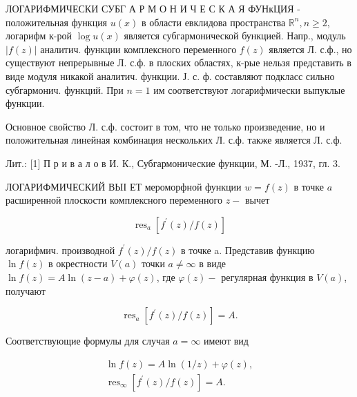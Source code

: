 \documentclass[10pt]{article}
\begin{document}
ЛОГАРИФМИЧЕСКИ СУБГ А Р М О Н И Ч Е С К А Я ФУНкЦИЯ - положительная функция $u(x)$ в области евклидова пространства $\mathbb{R}^{n}, n \geqslant 2$, логарифм к-рой $\log u(x)$ является субгармонической бункцией. Напр., модуль $|f(z)|$ аналитич. функции комплексного переменного $f(z)$ является Л. с.ф., но существуют непрерывные Л. с.ф. в плоских областях, к-рые нельзя представить в виде модуля никакой аналитич. функции. Ј. с. ф. составляют подкласс сильно субгармонич. функций. При $n=1$ им соответствуют логарифмически выпуклые функции.



Основное свойство Л. с.ф. состоит в том, что не только произведение, но и положительная линейная комбинация нескольких Л. с.ф. также является Л. с.ф.



Лит.: [1] П р и в а л о в И. К., Субгармонические функции, М. -Л., 1937, гл. 3.



ЛОГАРИФМИЧЕСКИЙ ВЫІ ЕТ мероморфной функции $w=f(z)$ в точке $a$ расширенной плоскости комплексного переменного $z-$ вычет



\[

\operatorname{res}_{a}\left[f^{\prime}(z) / f(z)\right]

\]



логарифмич. производной $f^{\prime}(z) / f(z)$ в точке a. Представив функцию $\ln f(z)$ в окрестности $V(a)$ точки $a \neq \infty$ в виде $\ln f(z)=A \ln (z-a)+\varphi(z)$, где $\varphi(z)-$ регулярная функция в $V(a)$, получают



\[

\operatorname{res}_{a}\left[f^{\prime}(z) / f(z)\right]=A .

\]



Соответствующие формулы для случая $a=\infty$ имеют вид



\[

\begin{gathered}

\ln f(z)=A \ln (1 / z)+\varphi(z), \\

\operatorname{res}_{\infty}\left[f^{\prime}(z) / f(z)\right]=A .

\end{gathered}

\]
\end{document}

